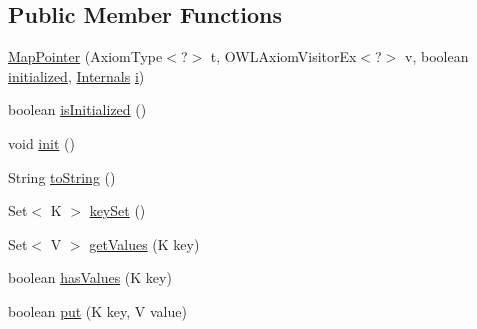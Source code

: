 \subsection*{Public Member Functions}
\begin{DoxyCompactItemize}
\item 
\hyperlink{classuk_1_1ac_1_1manchester_1_1cs_1_1owl_1_1owlapi_1_1_map_pointer_3_01_k_00_01_v_01extends_01_o_w_l_axiom_01_4_a2ab73ed25e114b35837c0ba0499dd077}{Map\-Pointer} (Axiom\-Type$<$?$>$ t, O\-W\-L\-Axiom\-Visitor\-Ex$<$?$>$ v, boolean \hyperlink{classuk_1_1ac_1_1manchester_1_1cs_1_1owl_1_1owlapi_1_1_map_pointer_3_01_k_00_01_v_01extends_01_o_w_l_axiom_01_4_a7ef53aea25e38c2c000b21ad300be956}{initialized}, \hyperlink{interfaceuk_1_1ac_1_1manchester_1_1cs_1_1owl_1_1owlapi_1_1_internals}{Internals} \hyperlink{classuk_1_1ac_1_1manchester_1_1cs_1_1owl_1_1owlapi_1_1_map_pointer_3_01_k_00_01_v_01extends_01_o_w_l_axiom_01_4_af74c2b3367a3d3b09269fbc9025fdaa8}{i})
\item 
boolean \hyperlink{classuk_1_1ac_1_1manchester_1_1cs_1_1owl_1_1owlapi_1_1_map_pointer_3_01_k_00_01_v_01extends_01_o_w_l_axiom_01_4_a8229acaa834d1cf9b5c6a29b0c6bb71f}{is\-Initialized} ()
\item 
void \hyperlink{classuk_1_1ac_1_1manchester_1_1cs_1_1owl_1_1owlapi_1_1_map_pointer_3_01_k_00_01_v_01extends_01_o_w_l_axiom_01_4_a128a4ac507866f19e9ea8d1fda0aaa30}{init} ()
\item 
String \hyperlink{classuk_1_1ac_1_1manchester_1_1cs_1_1owl_1_1owlapi_1_1_map_pointer_3_01_k_00_01_v_01extends_01_o_w_l_axiom_01_4_ac06154cb38109e7e26bff663a084bff6}{to\-String} ()
\item 
Set$<$ K $>$ \hyperlink{classuk_1_1ac_1_1manchester_1_1cs_1_1owl_1_1owlapi_1_1_map_pointer_3_01_k_00_01_v_01extends_01_o_w_l_axiom_01_4_aff399ea2a1cef7c46fb63057e39cecd4}{key\-Set} ()
\item 
Set$<$ V $>$ \hyperlink{classuk_1_1ac_1_1manchester_1_1cs_1_1owl_1_1owlapi_1_1_map_pointer_3_01_k_00_01_v_01extends_01_o_w_l_axiom_01_4_a6a799e4b4a4880d7a5824c7999e13d8a}{get\-Values} (K key)
\item 
boolean \hyperlink{classuk_1_1ac_1_1manchester_1_1cs_1_1owl_1_1owlapi_1_1_map_pointer_3_01_k_00_01_v_01extends_01_o_w_l_axiom_01_4_a4850601bf78aed8a6217841bffaa5abc}{has\-Values} (K key)
\item 
boolean \hyperlink{classuk_1_1ac_1_1manchester_1_1cs_1_1owl_1_1owlapi_1_1_map_pointer_3_01_k_00_01_v_01extends_01_o_w_l_axiom_01_4_ac4c5af8f42fc443928bfd9ba0e3c5409}{put} (K key, V value)
\item 

\end{DoxyCompactItemize}
